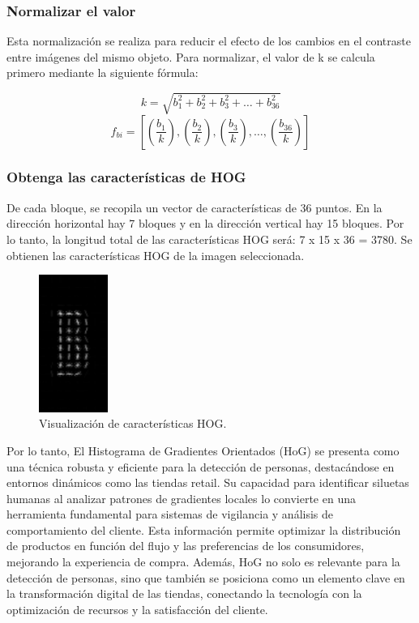 \subsubsection{Normalizar el valor }
Esta normalización se realiza para reducir el efecto de los cambios en el contraste entre imágenes del mismo objeto. Para normalizar, el valor de k se calcula primero mediante la siguiente fórmula:

\[
k = \sqrt{b_1^2 + b_2^2 + b_3^2 + \dots + b_{36}^2}
\]
\[
f_{bi} = \left[ \left(\frac{b_1}{k}\right), \left(\frac{b_2}{k}\right), \left(\frac{b_3}{k}\right), \dots, \left(\frac{b_{36}}{k}\right) \right]
\]


\subsubsection{Obtenga las características de HOG}
De cada bloque, se recopila un vector de características de 36 puntos. En la dirección horizontal hay 7 bloques y en la dirección vertical hay 15 bloques. Por lo tanto, la longitud total de las características HOG será: 7 x 15 x 36 = 3780. Se obtienen las características HOG de la imagen seleccionada.

\begin{figure}[H]
    \centering
    \includegraphics[width=0.20\textwidth]{2/2_teoria/figures/Hog5.jpg} %
    \caption{Visualización de características HOG.}
    \label{fig:etiqueta_imagen} %
\end{figure}

Por lo tanto, El Histograma de Gradientes Orientados (HoG) se presenta como una técnica robusta y eficiente para la detección de personas, destacándose en entornos dinámicos como las tiendas retail. Su capacidad para identificar siluetas humanas al analizar patrones de gradientes locales lo convierte en una herramienta fundamental para sistemas de vigilancia y análisis de comportamiento del cliente. Esta información permite optimizar la distribución de productos en función del flujo y las preferencias de los consumidores, mejorando la experiencia de compra. Además, HoG no solo es relevante para la detección de personas, sino que también se posiciona como un elemento clave en la transformación digital de las tiendas, conectando la tecnología con la optimización de recursos y la satisfacción del cliente.

